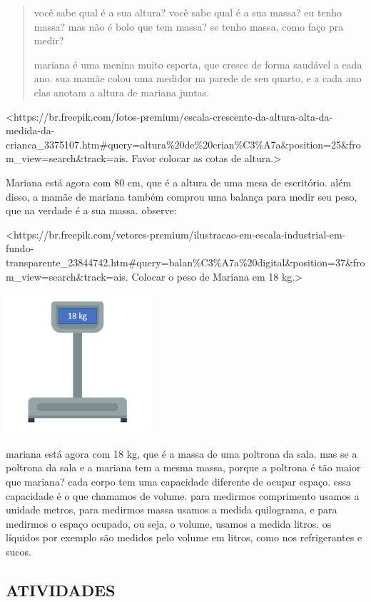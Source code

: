 \begin{quote}
você sabe qual é a sua altura? você sabe qual é a sua massa? eu tenho
massa? mas não é bolo que tem massa? se tenho massa, como faço pra
medir?

mariana é uma menina muito esperta, que cresce de forma saudável a cada
ano. sua mamãe colou uma medidor na parede de seu quarto, e a cada ano
elas anotam a altura de mariana juntas.
\end{quote}

\textless{}https://br.freepik.com/fotos-premium/escala-crescente-da-altura-alta-da-medida-da-crianca\_3375107.htm\#query=altura\%20de\%20crian\%C3\%A7a\&position=25\&from\_view=search\&track=ais.
Favor colocar as cotas de altura.\textgreater{}

Mariana está agora com 80 cm, que é a altura de uma mesa de escritório.
além disso, a mamãe de mariana também comprou uma balança para medir seu
peso, que na verdade é a sua massa. observe:

\textless{}https://br.freepik.com/vetores-premium/ilustracao-em-escala-industrial-em-fundo-transparente\_23844742.htm\#query=balan\%C3\%A7a\%20digital\&position=37\&from\_view=search\&track=ais.
Colocar o peso de Mariana em 18 kg.\textgreater{}

\includegraphics[width=2.13542in,height=2.04324in]{media/image22.png}

mariana está agora com 18 kg, que é a massa de uma poltrona da sala. mas
se a poltrona da sala e a mariana tem a mesma massa, porque a poltrona é
tão maior que mariana? cada corpo tem uma capacidade diferente de ocupar
espaço. essa capacidade é o que chamamos de volume. para medirmos
comprimento usamos a unidade metros, para medirmos massa usamos a medida
quilograma, e para medirmos o espaço ocupado, ou seja, o volume, usamos
a medida litros. os líquidos por exemplo são medidos pelo volume em
litros, como nos refrigerantes e sucos.

\subsection{ATIVIDADES }\label{atividades-2}

